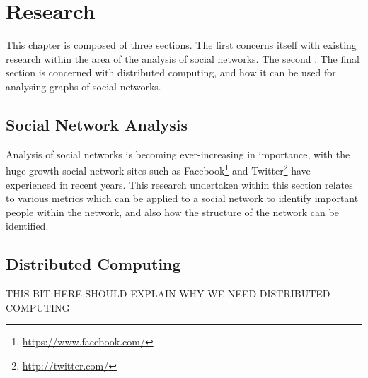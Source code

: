 \chapter{Research}
This chapter is composed of three sections. The first concerns itself with existing research within the area of the analysis of social networks. The second . The final section is concerned with distributed computing, and how it can be used for analysing graphs of social networks.


\section{Social Network Analysis}
Analysis of social networks is becoming ever-increasing in importance, with the huge growth social network sites such as Facebook\footnote{\url{https://www.facebook.com/}} and Twitter\footnote{\url{http://twitter.com/}} have experienced in recent years. This research undertaken within this section relates to various metrics which can be applied to a social network to identify important people within the network, and also how the structure of the network can be identified.








\section{Distributed Computing}
THIS BIT HERE SHOULD EXPLAIN WHY WE NEED DISTRIBUTED COMPUTING



